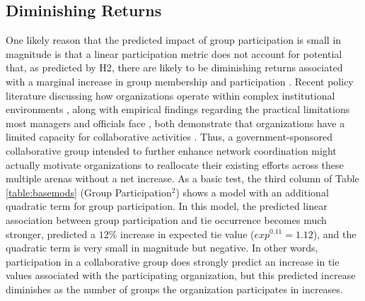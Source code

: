 \documentclass[12pt,a4paper,titlepage]{article}
\begin{document}
\subsection{Diminishing Returns}

One likely reason that the predicted impact of group participation is small in magnitude is that a linear participation metric does not account for potential that, as predicted by H2, there are likely to be diminishing returns associated with a marginal increase in group membership and participation \parencite{lubell2010}. Recent policy literature discussing how organizations operate within complex institutional environments \parencite[e.g.,][]{lubell2013,berardo2010}, along with empirical findings regarding the practical limitations most managers and officials face \parencite{thomas2003,margerum2011}, both demonstrate that organizations have a limited capacity for collaborative activities \parencite{lubell2010}. Thus, a government-sponsored collaborative group intended to further enhance network coordination might actually motivate organizations to reallocate their existing efforts across these multiple arenas without a net increase. As a basic test, the third column of Table \ref{table:basemods} (Group Participation$^2$) shows a model with an additional quadratic term for group participation. In this model, the predicted linear association between group participation and tie occurrence becomes much stronger, predicted a $12\%$ increase in expected tie value ($exp^{0.11} = 1.12$), and the quadratic term is very small in magnitude but negative. In other words, participation in a collaborative group does strongly predict an increase in tie values associated with the participating organization, but this predicted increase diminishes as the number of groups the organization participates in increases.
\end{document}
